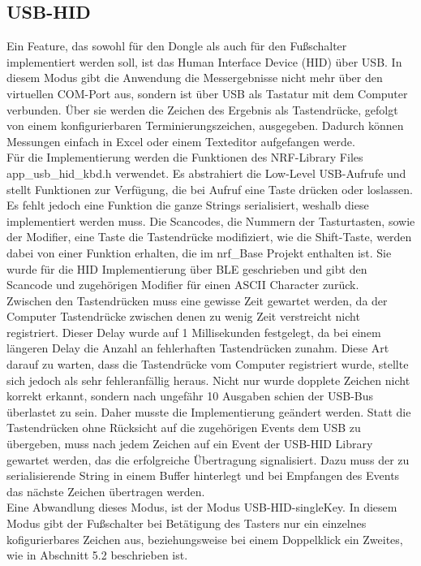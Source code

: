 \subsection{USB-HID}
Ein Feature, das sowohl für den Dongle als auch für den Fußschalter implementiert werden soll, ist das Human Interface Device (HID) über USB. In diesem Modus gibt die Anwendung die Messergebnisse nicht mehr über den virtuellen COM-Port aus, sondern ist über USB als Tastatur mit dem Computer verbunden. Über sie werden die Zeichen des Ergebnis als Tastendrücke, gefolgt von einem konfigurierbaren Terminierungszeichen, ausgegeben. Dadurch können Messungen einfach in Excel oder einem Texteditor aufgefangen werde.\\
Für die Implementierung werden die Funktionen des NRF-Library Files app\_usb\_hid\_kbd.h verwendet. Es abstrahiert die Low-Level USB-Aufrufe und stellt Funktionen zur Verfügung, die bei Aufruf eine Taste drücken oder loslassen. Es fehlt jedoch eine Funktion die ganze Strings serialisiert, weshalb diese implementiert werden muss. Die Scancodes, die Nummern der Tasturtasten, sowie der Modifier, eine Taste die Tastendrücke modifiziert, wie die Shift-Taste, werden dabei von einer Funktion erhalten, die im nrf\_Base Projekt enthalten ist. Sie wurde für die HID Implementierung über BLE geschrieben und gibt den Scancode und zugehörigen Modifier für einen ASCII Character zurück.\\
Zwischen den Tastendrücken muss eine gewisse Zeit gewartet werden, da der Computer Tastendrücke zwischen denen zu wenig Zeit verstreicht nicht registriert. Dieser Delay wurde auf 1 Millisekunden festgelegt, da bei einem längeren Delay die Anzahl an fehlerhaften Tastendrücken zunahm. Diese Art darauf zu warten, dass die Tastendrücke vom Computer registriert wurde, stellte sich jedoch als sehr fehleranfällig heraus. Nicht nur wurde dopplete Zeichen nicht korrekt erkannt, sondern nach ungefähr 10 Ausgaben schien der USB-Bus überlastet zu sein. Daher musste die Implementierung geändert werden. Statt die Tastendrücken ohne Rücksicht auf die zugehörigen Events dem USB zu übergeben, muss nach jedem Zeichen auf ein Event der USB-HID Library gewartet werden, das die erfolgreiche Übertragung signalisiert. Dazu muss der zu serialisierende String in einem Buffer hinterlegt und bei Empfangen des Events das nächste Zeichen übertragen werden.\\
Eine Abwandlung dieses Modus, ist der Modus USB-HID-singleKey. In diesem Modus gibt der Fußschalter bei Betätigung des Tasters nur ein einzelnes kofigurierbares Zeichen aus, beziehungsweise bei einem Doppelklick ein Zweites, wie in Abschnitt 5.2 beschrieben ist.

